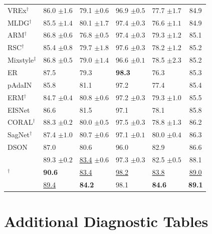 \begin{table}[htbp]
\begin{tabular}{lllll|c}
VREx$^\dagger$ & 86.0 \scriptsize$\pm1.6$ & 79.1 \scriptsize$\pm0.6$ & 96.9 \scriptsize$\pm0.5$ & 77.7 \scriptsize$\pm1.7$ & 84.9 \\
MLDG$^\dagger$ & 85.5 \scriptsize$\pm1.4$ & 80.1 \scriptsize$\pm1.7$ & 97.4 \scriptsize$\pm0.3$ & 76.6 \scriptsize$\pm1.1$ & 84.9 \\
ARM$^\dagger$ & 86.8 \scriptsize$\pm0.6$ & 76.8 \scriptsize$\pm0.5$ & 97.4 \scriptsize$\pm0.3$ & 79.3 \scriptsize$\pm1.2$ & 85.1 \\
RSC$^\dagger$ & 85.4 \scriptsize$\pm0.8$ & 79.7 \scriptsize$\pm1.8$ & 97.6 \scriptsize$\pm0.3$ & 78.2 \scriptsize$\pm1.2$ & 85.2 \\
Mixstyle$^\ddagger$ & 86.8 \scriptsize$\pm0.5$ & 79.0 \scriptsize$\pm1.4$ & 96.6 \scriptsize$\pm0.1$ & 78.5 \scriptsize$\pm2.3$ & 85.2 \\
ER & 87.5 & 79.3 & \textbf{98.3} & 76.3 & 85.3 \\
pAdaIN & 85.8 & 81.1 & 97.2 & 77.4 & 85.4 \\
ERM$^\dagger$ & 84.7 \scriptsize$\pm0.4$ & 80.8 \scriptsize$\pm0.6$ & 97.2 \scriptsize$\pm0.3$ & 79.3 \scriptsize$\pm1.0$ & 85.5 \\
EISNet & 86.6 & 81.5 & 97.1 & 78.1 & 85.8 \\
CORAL$^\dagger$ & 88.3 \scriptsize$\pm0.2$ & 80.0 \scriptsize$\pm0.5$ & 97.5 \scriptsize$\pm0.3$ & 78.8 \scriptsize$\pm1.3$ & 86.2 \\
SagNet$^\dagger$ & 87.4 \scriptsize$\pm1.0$ & 80.7 \scriptsize$\pm0.6$ & 97.1 \scriptsize$\pm0.1$ & 80.0 \scriptsize$\pm0.4$ & 86.3 \\
DSON & 87.0 & 80.6 & 96.0 & 82.9 & 86.6 \\
\swad{} & 89.3 \scriptsize$\pm0.2$ & \underline{83.4} \scriptsize$\pm0.6$ & 97.3 \scriptsize$\pm0.3$ & 82.5 \scriptsize$\pm0.5$ & 88.1 \\
\diwa{}$^\dagger$ & \textbf{90.6} & \underline{83.4} & \underline{98.2} & \underline{83.8} & \underline{89.0} \\
\midrule
\cda{} & \underline{89.4} & \textbf{84.2} & 98.1 & \textbf{84.6} & \textbf{89.1} \\
\bottomrule
\end{tabular}
\end{table}

\section{Additional Diagnostic Tables}
\label{app:diagnostic_tables}

